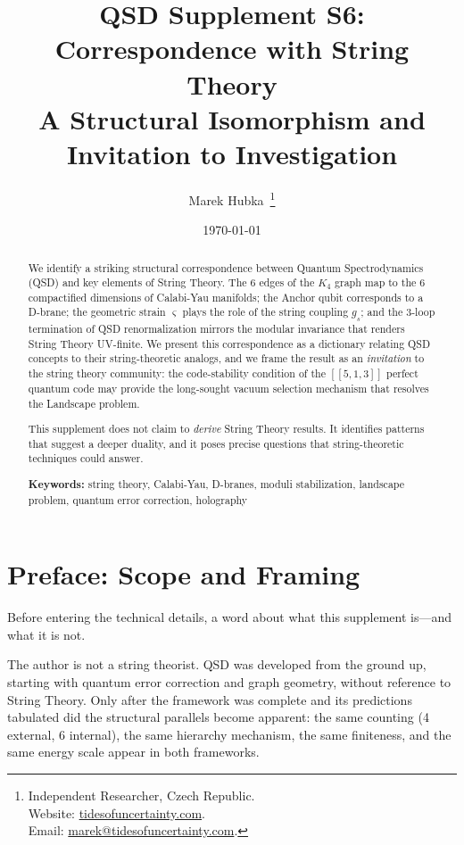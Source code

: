 \documentclass[11pt,a4paper]{article}
\title{
  \textbf{QSD Supplement S6: \\[0.5em] Correspondence with String Theory}\\[0.5em]
  \Large A Structural Isomorphism and Invitation to Investigation\\[1em]
}
\author{
  Marek Hubka\, \orcidlink{0009-0003-2476-9017}
  \thanks{
    Independent Researcher, Czech Republic.\\
    Website: \href{http://www.tidesofuncertainty.com}{tidesofuncertainty.com}.\\
    Email: \href{mailto:marek@tidesofuncertainty.com}{marek@tidesofuncertainty.com}.
  }
}
\date{\today}
\theoremstyle{definition}
\newcommand{\strain}{\varsigma}            %
\newcommand{\gs}{g_s}
\begin{document}
\maketitle

\begin{abstract}
\noindent We identify a striking structural correspondence between Quantum
Spectrodynamics (QSD) and key elements of String Theory.  The 6 edges of the
$K_4$ graph map to the 6 compactified dimensions of Calabi-Yau manifolds; the
Anchor qubit corresponds to a D-brane; the geometric strain $\strain$ plays the
role of the string coupling $\gs$; and the 3-loop termination of QSD
renormalization mirrors the modular invariance that renders String Theory
UV-finite.  We present this correspondence as a dictionary relating QSD
concepts to their string-theoretic analogs, and we frame the result as an
\emph{invitation} to the string theory community: the code-stability condition
of the $[[5,1,3]]$ perfect quantum code may provide the long-sought vacuum
selection mechanism that resolves the Landscape problem.

This supplement does not claim to \emph{derive} String Theory results.  It
identifies patterns that suggest a deeper duality, and it poses precise
questions that string-theoretic techniques could answer.

\vspace{0.5em}
\noindent\textbf{Keywords:} string theory, Calabi-Yau, D-branes, moduli stabilization, landscape problem, quantum error correction, holography
\end{abstract}

\tableofcontents

\section{Preface: Scope and Framing}
\label{sec:preface}

Before entering the technical details, a word about what this supplement
is---and what it is not.

The author is not a string theorist.  QSD was developed from the ground up,
starting with quantum error correction and graph geometry, without reference to
String Theory.  Only after the framework was complete and its predictions
tabulated did the structural parallels become apparent: the same counting (4
external, 6 internal), the same hierarchy mechanism, the same finiteness, and
the same energy scale appear in both frameworks.
\end{document}
